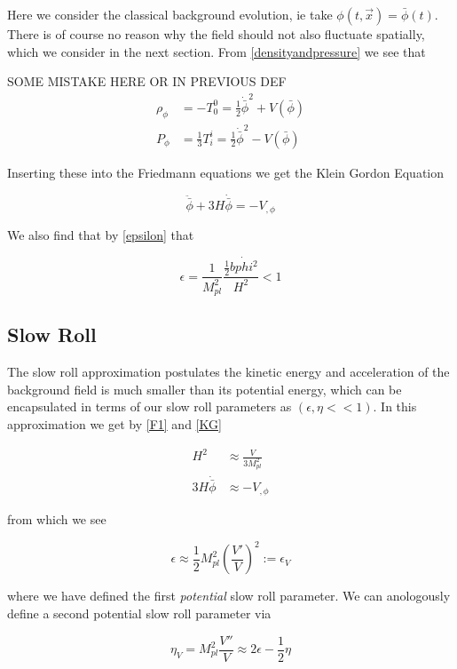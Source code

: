\documentclass[a4paper,11pt]{article}
\newcommand{\Mp}{M_{pl}}
\newcommand{\half}{\frac{1}{2}}
\newcommand{\bphi}{\bar{\phi}}
\begin{document}
Here we consider the classical background evolution, ie take $\phi(t,\vec{x}) = \bphi(t)$. There is of course no reason why the field should not also fluctuate spatially, which we consider in the next section. From \ref{densityandpressure} we see that 


SOME MISTAKE HERE OR IN PREVIOUS DEF
\begin{align}
\rho_\phi &=-T^0_0 = \half \dot{\bphi}^2+V(\bphi)\\
P_\phi&=\frac{1}{3}T^i_i = \half \dot{\bphi}^2-V(\bphi)
\end{align}

Inserting these into the Friedmann equations we get the Klein Gordon Equation

\begin{equation}
\tag{KG}
\ddot{\bphi}+3H\dot{\bphi}=-V_{,\phi}
\end{equation}

We also find that by \ref{epsilon} that 

\begin{equation}
\epsilon = \frac{1}{\Mp^2}\frac{\half\dot{bphi^2}}{H^2} < 1
\end{equation}

\subsection{Slow Roll}

The slow roll approximation postulates the kinetic energy and acceleration of the background field is much smaller than its potential energy, which can be encapsulated in terms of our slow roll parameters as $(\epsilon, \eta << 1)$. In this approximation we get by \ref{F1} and \ref{KG} 

\begin{align}
H^2 &\approx \frac{V}{3\Mp^2} \\
3H\dot{\bphi} &\approx -V_{,\phi}
\end{align}

from which we see 

\begin{equation}
\epsilon \approx \half\Mp^2 (\frac{V'}{V})^2 := \epsilon_V
\end{equation}

where we have defined the first \textit{potential} slow roll parameter. We can anologously define a second potential slow roll parameter via

\begin{equation}
\eta_V = \Mp^2 \frac{V''}{V} \approx 2\epsilon - \half\eta
\end{equation}
\end{document}
